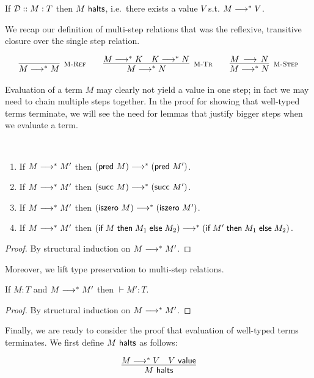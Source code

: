 \begin{theorem}
If $\mathbin{{\mathcal{D}} :: M : T }$ then $M ~\mathsf{halts}$, i.e.~there exists a value $V$ s.t. $M
\longrightarrow^* V$.
\end{theorem}

We recap our definition of multi-step relations that was the
reflexive, transitive closure over the single step relation.

\[
\begin{array}{c@{\qquad}c@{\qquad}c}
\infer[\MRef]{M \MSteps M}{} &
\infer[\MTr]{M \MSteps N}{M \MSteps K & K \MSteps N} &
\infer[\MStep]{M \MSteps N}{M \Steps N}
\end{array}
\]

Evaluation of a term $M$ may clearly not yield a value in one step; in fact we may need to chain multiple steps together.
In the proof for showing that well-typed terms terminate, we will see the need for lemmas that justify bigger steps when we evaluate a term.

\begin{lemma}~
  \begin{enumerate}
  \item If $M \longrightarrow^* M'$ then $(\textsf{pred}~M) \longrightarrow^* (\textsf{pred}~M')$.
  \item If $M \longrightarrow^* M'$ then $(\textsf{succ}~M) \longrightarrow^* (\textsf{succ}~M')$.
  \item If $M \longrightarrow^* M'$ then $(\textsf{iszero}~M) \longrightarrow^* (\textsf{iszero}~M')$.
  \item If $M \longrightarrow^* M'$ then $(\textsf{if\;} M \textsf{\;then\;} M_1 \textsf{\;else\;} M_2) \longrightarrow^* (\textsf{if\;} M' \textsf{\;then\;} M_1 \textsf{\;else\;} M_2)$.
  \end{enumerate}
\end{lemma}
\begin{proof}
By structural induction  on $M \longrightarrow^* M'$.
\end{proof}

Moreover, we lift type preservation to multi-step relations.

\begin{lemma}
If $M : T$ and $M \longrightarrow^* M'$ then $\vdash M':T$.
\end{lemma}
\begin{proof}
By structural induction on $M \longrightarrow^* M'$.
\end{proof}

Finally, we are ready to consider the proof that evaluation of well-typed terms
terminates. We first define $M ~\mathsf{halts}$ as follows:

\[
\begin{array}{c}
\infer{M \Halts}{M \MSteps V & V \Value }
\end{array}
\]

